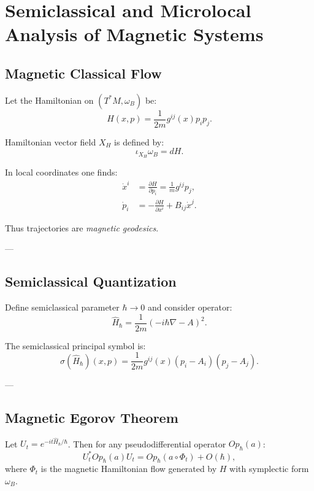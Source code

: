 \section{Semiclassical and Microlocal Analysis of Magnetic Systems}

\subsection{Magnetic Classical Flow}

Let the Hamiltonian on $(T^*M,\omega_B)$ be:
\[
H(x,p)=\frac{1}{2m} g^{ij}(x)p_i p_j.
\]

Hamiltonian vector field $X_H$ is defined by:
\[
\iota_{X_H} \omega_B = dH.
\]

In local coordinates one finds:
\begin{align}
\dot{x}^i &= \frac{\partial H}{\partial p_i} = \frac{1}{m} g^{ij} p_j, \\
\dot{p}_i &= -\frac{\partial H}{\partial x^i} + B_{ij} \dot{x}^j.
\end{align}

Thus trajectories are \emph{magnetic geodesics}.

---

\subsection{Semiclassical Quantization}

Define semiclassical parameter $\hbar \to 0$ and consider operator:
\[
\hat{H}_\hbar = \frac{1}{2m}(-i\hbar\nabla - A)^2.
\]

\begin{definition}
The semiclassical principal symbol is:
\[
\sigma(\hat{H}_\hbar)(x,p) = \frac{1}{2m} g^{ij}(x) (p_i - A_i)(p_j - A_j).
\]
\end{definition}

---

\subsection{Magnetic Egorov Theorem}

\begin{theorem}
Let $U_t = e^{-it\hat{H}_\hbar/\hbar}$. Then for any pseudodifferential operator $Op_\hbar(a)$:
\[
U_t^* Op_\hbar(a) U_t
=
Op_\hbar(a \circ \Phi_t) + O(\hbar),
\]
where $\Phi_t$ is the magnetic Hamiltonian flow generated by $H$ with symplectic form $\omega_B$.
\end{theorem}

